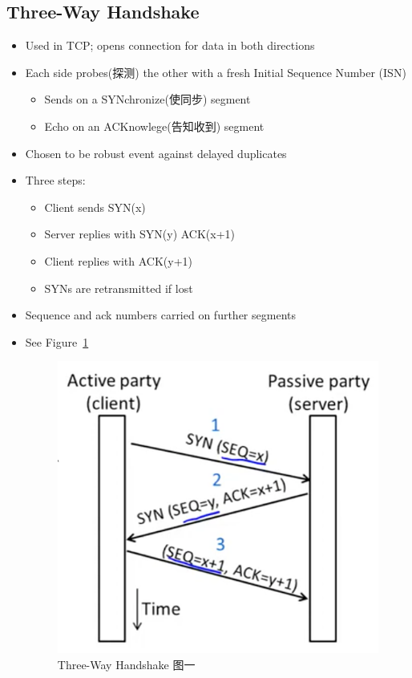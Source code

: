 \documentclass[12pt]{ctexart}   %
\begin{document}
	\subsection{Three-Way Handshake}
	\begin{itemize}
		\item Used in TCP; opens connection for data in both directions
		\item Each side probes(探测) the other with a fresh Initial Sequence Number (ISN)
		\begin{itemize}
			\item Sends on a SYNchronize(使同步) segment
			\item Echo on an ACKnowlege(告知收到) segment
		\end{itemize}
		
		\item Chosen to be robust event against delayed duplicates
		
		\item Three steps:
		\begin{itemize}
			\item Client sends SYN(x)
			\item Server replies with SYN(y) ACK(x+1)
			\item Client replies with ACK(y+1)
			\item SYNs are retransmitted if lost
		\end{itemize}
		
		\item Sequence and ack numbers carried on further segments
		\item See Figure~\ref{fig:6-3-2}
		 
		 \begin{figure}[h!] %
		\centering
		 \includegraphics[scale=0.7]{images/6-3-2}
		\caption{ Three-Way Handshake 图一 }
		 \label{fig:6-3-2}
		 \end{figure}
		 

\end{itemize}
\end{document}
